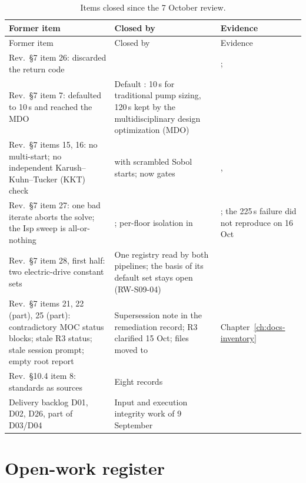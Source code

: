 {\rwsmall
\begin{longtable}{@{}P{5.0cm}P{6.2cm}P{4.9cm}@{}}
\caption{Items closed since the 7 October review.}\label{tab:rw-closed}\\
\toprule
Former item & Closed by & Evidence \\
\midrule
\endfirsthead
\toprule
Former item & Closed by & Evidence \\
\midrule
\endhead
Rev.\ \S7 item 26:  discarded the return code &  & ;  \\
Rev.\ \S7 item 7:  defaulted to 10\,s and reached the MDO & Default : 10\,s for traditional pump sizing, 120\,s kept by the multidisciplinary design optimization (MDO) &  \\
Rev.\ \S7 items 15, 16: no multi-start; no independent Karush--Kuhn--Tucker (KKT) check &  with scrambled Sobol starts;  now gates  & ,  \\
Rev.\ \S7 item 27: one bad iterate aborts the solve; the Isp sweep is all-or-nothing & ; per-floor isolation in  & ; the 225\,s failure did not reproduce on 16 Oct \\
Rev.\ \S7 item 28, first half: two electric-drive constant sets & One registry read by both pipelines; the basis of its default set stays open (RW-S09-04) &  \\
Rev.\ \S7 items 21, 22 (part), 25 (part): contradictory MOC status blocks; stale R3 status; stale session prompt; empty root report & Supersession note in the remediation record; R3 clarified 15 Oct; files moved to  & Chapter~\ref{ch:docs-inventory} \\
Rev.\ \S10.4 item 8: standards as sources & Eight  records &  \\
Delivery backlog D01, D02, D26, part of D03/D04 & Input and execution integrity work of 9 September &  \\
\bottomrule
\end{longtable}
}

\section{Open-work register}\label{sec:rw-register}

